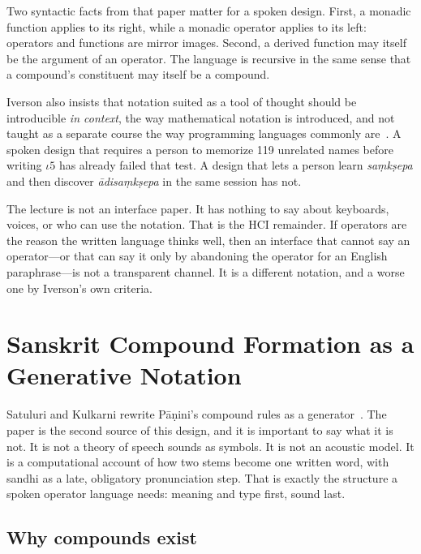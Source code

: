 \documentclass[manuscript, review, anonymous]{acmart}
\begin{document}
Two syntactic facts from that paper matter for a spoken design. First, a monadic function applies to its right, while a monadic operator applies to its left: operators and functions are mirror images. Second, a derived function may itself be the argument of an operator. The language is recursive in the same sense that a compound's constituent may itself be a compound.

Iverson also insists that notation suited as a tool of thought should be introducible \emph{in context}, the way mathematical notation is introduced, and not taught as a separate course the way programming languages commonly are~\cite{Iverson1980Notation}. A spoken design that requires a person to memorize 119 unrelated names before writing $\iota 5$ has already failed that test. A design that lets a person learn \textit{sa{\d{m}}k{\d{s}}epa} and then discover \textit{{\=a}disa{\d{m}}k{\d{s}}epa} in the same session has not.

The lecture is not an interface paper. It has nothing to say about keyboards, voices, or who can use the notation. That is the HCI remainder. If operators are the reason the written language thinks well, then an interface that cannot say an operator---or that can say it only by abandoning the operator for an English paraphrase---is not a transparent channel. It is a different notation, and a worse one by Iverson's own criteria.

\section{Sanskrit Compound Formation as a Generative Notation}
\label{sec:samasa}

Satuluri and Kulkarni rewrite P{\=a}{\d{n}}ini's compound rules as a generator~\cite{Satuluri2013Generation}. The paper is the second source of this design, and it is important to say what it is not. It is not a theory of speech sounds as symbols. It is not an acoustic model. It is a computational account of how two stems become one written word, with sandhi as a late, obligatory pronunciation step. That is exactly the structure a spoken operator language needs: meaning and type first, sound last.

\subsection{Why compounds exist}
\end{document}
